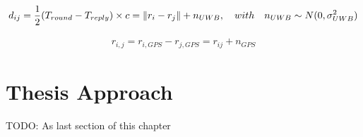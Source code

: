 \begin{gather*}
    d_{ij} = \frac{1}{2}(T_{round} - T_{reply}) \times c = \left\lVert r_i - r_j\right\rVert + n_{UWB}, \quad with \quad n_{UWB} \sim N(0, \sigma^2_{UWB}) 
\end{gather*}

\begin{gather*}
    r_{i,j} = r_{i, GPS} - r_{j, GPS} = r_{ij} + n_{GPS}
\end{gather*}

        

        












\section{Thesis Approach}
TODO: As last section of this chapter
